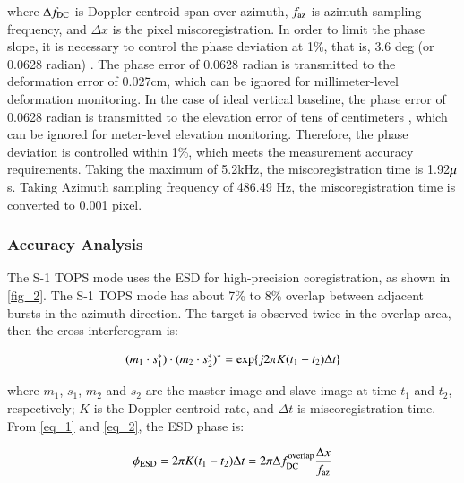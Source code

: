 \documentclass[preprint, authoryear]{elsarticle}
\begin{document}
\noindent where $\Delta f_{\rm DC}$ is Doppler centroid span over azimuth, $f_{\rm az}$ is azimuth sampling frequency, and $\Delta x$ is the pixel miscoregistration. In order to limit the phase slope, it is necessary to control the phase deviation at 1\%, that is, 3.6 deg (or 0.0628 radian) \cite{Interferometric_Processing_of_Sentinel-1_TOPS_Data}. The phase error of 0.0628 radian is transmitted to the deformation error of 0.027cm, which can be ignored for millimeter-level deformation monitoring. In the case of ideal vertical baseline, the phase error of 0.0628 radian is transmitted to the elevation error of tens of centimeters \cite{Effects_of_Phase_Error_on_the_Relative_Height_Accuracy_in_Interferometric_Synthetic_Aperture_Radar}, which can be ignored for meter-level elevation monitoring. Therefore, the phase deviation is controlled within 1\%, which meets the measurement accuracy requirements. Taking the maximum  of 5.2kHz, the miscoregistration time is 1.92$\rm\mu$s. Taking Azimuth sampling frequency of 486.49 Hz, the miscoregistration time is converted to 0.001 pixel. \par


\subsubsection{Accuracy Analysis}

The S-1 TOPS mode uses the ESD for high-precision coregistration, as shown in \ref{fig_2}. The S-1 TOPS mode has about 7\% to 8\% overlap between adjacent bursts in the azimuth direction. The target is observed twice in the overlap area, then the cross-interferogram is: \par

\begin{equation}
    (m_1 \cdot s_1^*) \cdot (m_2 \cdot s_2^*)^* = {\rm exp} \{j 2 \pi K (t_1 - t_2) \Delta t \}
    \label{eq_2}
\end{equation}

\noindent where $m_1$, $s_1$, $m_2$ and $s_2$ are the master image and slave image at time $t_1$ and $t_2$, respectively; $K$ is the Doppler centroid rate, and $\Delta t$ is miscoregistration time. From \ref{eq_1} and \ref{eq_2}, the ESD phase is: \par

\begin{equation}
    \phi_{\rm ESD} = 2 \pi K (t_1 - t_2) \Delta t = 2 \pi \Delta f_{\rm DC}^{\rm overlap} \frac{\Delta x}{f_{\rm az}}
    \label{eq_3}
\end{equation}
\end{document}
